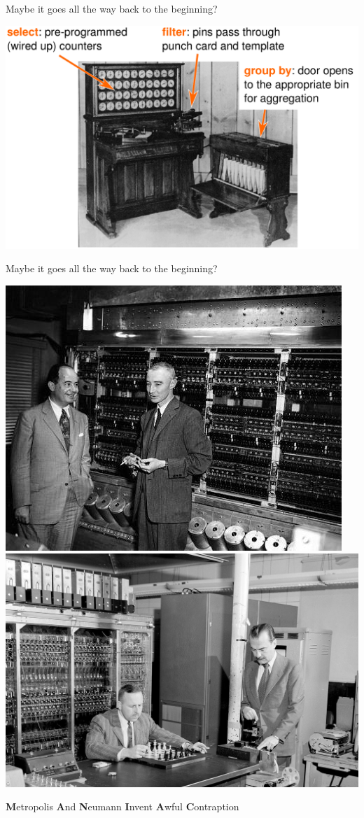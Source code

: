 \documentclass[aspectratio=169]{beamer}
\begin{document}
\begin{frame}{Maybe it goes all the way back to the beginning?}
\vspace{0.25 cm}
\begin{center}
\includegraphics[width=0.83\linewidth]{hh-tabulator.pdf}
\end{center}
\end{frame}

\begin{frame}{Maybe it goes all the way back to the beginning?}
\vspace{0.5 cm}

\includegraphics[height=5 cm]{neumann_oppie.jpg} \includegraphics[height=5 cm]{metropolis.jpg}

\begin{center}
\Large {\bf M}etropolis {\bf A}nd {\bf N}eumann {\bf I}nvent {\bf A}wful {\bf C}ontraption
\end{center}
\end{frame}
\end{document}
